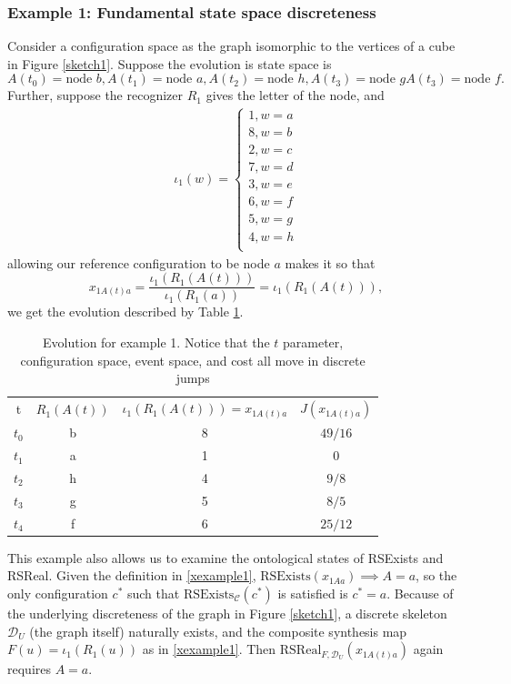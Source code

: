 \documentclass[11pt,a4paper]{article}
\newcommand{\RSExists}{\mathrm{RSExists}}
\newcommand{\RSReal}{\mathrm{RSReal}}
\begin{document}
\subsubsection{Example 1: Fundamental state space discreteness}
Consider a configuration space as the graph isomorphic to the vertices of a cube in Figure \ref{sketch1}. Suppose the evolution is state space is 
\begin{equation}
    A(t_0)=\text{node }b, A(t_1)=\text{node }a, A(t_2)=\text{node }h,  A(t_3)=\text{node }g  A(t_3)=\text{node }f.
    \label{states}
\end{equation}
Further, suppose the recognizer $R_1$ gives the letter of the node, and 
\begin{align}
    \iota_1(w)=\begin{cases}1,w=a\\
    8,w=b\\
    2,w=c\\
    7,w=d\\
    3,w=e\\
    6,w=f\\
    5,w=g\\
    4,w=h\\
    \end{cases}
\end{align}
allowing our reference configuration to be node $a$ makes it so that
\begin{equation}
    x_{1A(t)a}=\frac{\iota_1(R_1(A(t)))}{\iota_1(R_1(a))}=\iota_1(R_1(A(t))), \label{xexample1}
\end{equation}
we get the evolution described by Table \ref{tab:example1}.
\begin{table}[h]
    \centering
    \begin{tabular}{c|c|c|c}
         t &$R_1(A(t))$&$\iota_1(R_1(A(t)))=x_{1A(t)a}$ &$J(x_{1A(t)a})$ \\
         $t_0$& b&8&$49/16 $\\
         $t_1$&a&1&0\\
         $t_2$&h&4&$9/8$\\
        $t_3$&g&5&$8/5$\\
         $t_4$&f&6&$25/12$
    \end{tabular}
    \caption{Evolution for example 1. Notice that the $t$ parameter, configuration space, event space, and cost all move in discrete jumps}
    \label{tab:example1}
\end{table}

This example also allows us to examine the ontological states of RSExists and RSReal. Given the definition in \ref{xexample1}, $\RSExists(x_{1Aa})\implies A=a$, so the only configuration $c^*$ such that $\RSExists_{\mathcal{C}}(c^*)$ is satisfied is $c^*=a$. Because of the underlying discreteness of the graph in Figure \ref{sketch1}, a discrete skeleton $\mathcal{D}_U$ (the graph itself) naturally exists, and the composite synthesis map $F(u)=\iota_1(R_1(u))$ as in \ref{xexample1}. Then $\RSReal_{F,\mathcal{D}_U}(x_{1A(t)a})$ again requires $A=a$.
\end{document}
